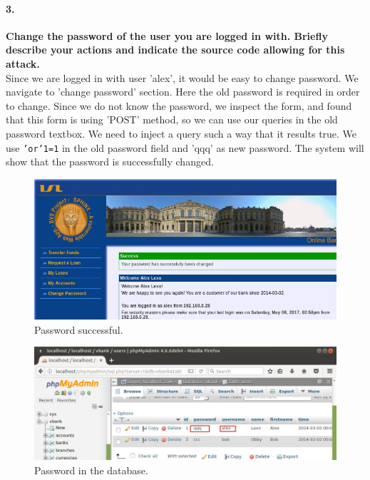 \documentclass[12pt]{report}
\begin{document}
	\paragraph*{3.} {\bf Change the password of the user you are logged in with. Briefly describe your actions and indicate the source code allowing for this attack.}\\
	Since we are logged in with user 'alex', it would be easy to change password. We navigate to 'change password' section. Here the old password is required in order to change. Since we do not know the password, we inspect the form, and found that this form is using 'POST' method, so we can use our queries in the old password textbox. We need to inject a query such a way that it results true. We use {\tt 'or'1=1} in the old password field and 'qqq' as new password. The system will show that the password is successfully changed.
	\begin{figure}[H]
		\includegraphics[width=0.75\textheight,height=0.3\textheight]{images/passsuccess.jpg}
		\caption{Password successful.}
	\end{figure}
	\begin{figure}[H]
		\includegraphics[width=0.75\textheight,height=0.2\textheight]{images/showpass.jpg}
		\caption{Password in the database.}
	\end{figure}
	
\end{document}
